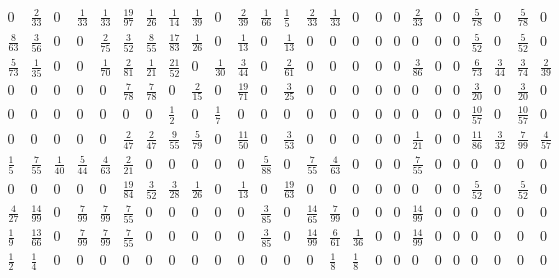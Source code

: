 \documentclass[11pt]{report}
\begin{document}
{\begin{appendices}
\begin{landscape}
\begin{figure} [h!]
\begin{equation*}
\begin{array}{ccccccccccccccccccccccccc}
0&\frac{2}{33}&0&\frac{1}{33}&\frac{1}{33}&\frac{19}{97}&\frac{1}{26}&\frac{1}{14}&\frac{1}{39}&0&\frac{2}{39}&\frac{1}{66}&\frac{1}{5}&\frac{2}{33}&\frac{1}{33}&0&0&0&\frac{2}{33}&0&0&\frac{5}{78}&0&\frac{5}{78}&0\\

\frac{8}{63}&\frac{3}{56}&0&0&\frac{2}{75}&\frac{3}{52}&\frac{8}{55}&\frac{17}{83}&\frac{1}{26}&0&\frac{1}{13}&0&\frac{1}{13}&0&0&0&0&0&0&0&0&\frac{5}{52}&0&\frac{5}{52}&0\\

\frac{5}{73}&\frac{1}{35}&0&0&\frac{1}{70}&\frac{2}{81}&\frac{1}{21}&\frac{21}{52}&0&\frac{1}{30}&\frac{3}{44}&0&\frac{2}{61}&0&0&0&0&0&\frac{3}{86}&0&0&\frac{6}{73}&\frac{3}{44}&\frac{3}{74}&\frac{2}{39}\\

0&0&0&0&0&\frac{7}{78}&\frac{7}{78}&0&\frac{2}{15}&0&\frac{19}{71}&0&\frac{3}{25}&0&0&0&0&0&0&0&0&\frac{3}{20}&0&\frac{3}{20}&0\\

0&0&0&0&0&0&0&\frac{1}{2}&0&\frac{1}{7}&0&0&0&0&0&0&0&0&0&0&0&\frac{10}{57}&0&\frac{10}{57}&0\\

0&0&0&0&0&\frac{2}{47}&\frac{2}{47}&\frac{9}{55}&\frac{5}{79}&0&\frac{11}{50}&0&\frac{3}{53}&0&0&0&0&0&\frac{1}{21}&0&0&\frac{11}{86}&\frac{3}{32}&\frac{7}{99}&\frac{4}{57}\\

\frac{1}{5}&\frac{7}{55}&\frac{1}{40}&\frac{5}{44}&\frac{4}{63}&\frac{2}{21}&0&0&0&0&0&\frac{5}{88}&0&\frac{7}{55}&\frac{4}{63}&0&0&0&\frac{7}{55}&0&0&0&0&0&0\\

0&0&0&0&0&\frac{19}{84}&\frac{3}{52}&\frac{3}{28}&\frac{1}{26}&0&\frac{1}{13}&0&\frac{19}{63}&0&0&0&0&0&0&0&0&\frac{5}{52}&0&\frac{5}{52}&0\\

\frac{4}{27}&\frac{14}{99}&0&\frac{7}{99}&\frac{7}{99}&\frac{7}{55}&0&0&0&0&0&\frac{3}{85}&0&\frac{14}{65}&\frac{7}{99}&0&0&0&\frac{14}{99}&0&0&0&0&0&0\\

\frac{1}{9}&\frac{13}{66}&0&\frac{7}{99}&\frac{7}{99}&\frac{7}{55}&0&0&0&0&0&\frac{3}{85}&0&\frac{14}{99}&\frac{6}{61}&\frac{1}{36}&0&0&\frac{14}{99}&0&0&0&0&0&0\\

\frac{1}{2}&\frac{1}{4}&0&0&0&0&0&0&0&0&0&0&0&0&\frac{1}{8}&\frac{1}{8}&0&0&0&0&0&0&0&0&0\\


\end{array}
\end{equation*}
\end{figure}
\end{landscape}
\end{appendices}}
\end{document}
